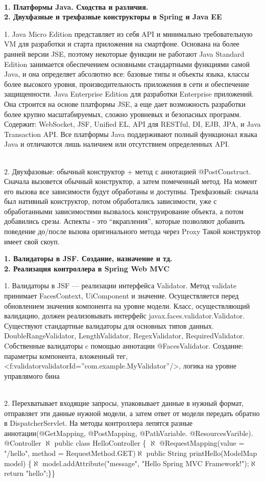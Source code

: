 \documentclass{article}
\newcommand{\bil}[4]{%
    \begin{minipage}{.3\textwidth}
        \textbf{1. #1} \\
        \textbf{2. #2}

        1. #3
        \\
        2. #4
    \end{minipage}
}
\begin{document}
\\
\bil{Платформы Java. Сходства и различия.}{Двухфазные и трехфазные конструкторы в Spring и Java EE}{
    Java Micro Edition представляет из себя API и минимально требовательную VM для разработки и старта приложения на смартфоне. Основана на более ранней версии JSE, поэтому некоторые функции не работают
    Java Standard Edition занимается обеспечением основными стандартными функциями самой Java, и она определяет абсолютно все: базовые типы и объекты языка, классы более высокого уровня, производительность приложения в сети и обеспечение защищенности.
    Java Enterprise Edition для разработки Enterprise приложений. Она строится на основе платформы JSE, а еще дает возможность разработки более крупно масштабируемых, сложно уровневых и безопасных программ. Содержит: WebSocket, JSF, Unified EL, API для RESTful, DI, EJB, JPA, и Java Transaction API.
    Все платформы Java поддерживают полный функционал языка Java и отличаются лишь наличием или отсутствием определенных API.
}{
    Двухфазовые: обычный конструктор + метод с аннотацией @PostConstruct. 
    Сначала вызовется обычный конструктор, а затем помеченный метод. 
    На момент его вызова все зависимости будут обработаны и доступны.
    Трехфазовый: сначала был нативный конструктор, потом обработались зависимости, уже с обработанными зависимостями вызвалось конструирование объекта, а потом добавились срезы. 
    Аспекты - это “вкрапления”, которые позволяют добавить поведение до/после вызова оригинального метода через Proxy
    Такой конструктор имеет свой скоуп.
}
\hfill
\bil{Валидаторы в JSF. Создание, назначение и тд.}{Реализация контроллера в Spring Web MVC}{
    Валидаторы в JSF — реализации интерфейса Validator. Метод validate принимает FacesContext, UiComponent и значение.
    Осуществляется перед обновлением значения компонента на уровне модели. Класс, осуществляющий валидацию, должен реализовывать 
    интерфейс javax.faces.validator.Validator. Существуют стандартные валидаторы для основных типов данных.  
    DoubleRangeValidator, LengthValidator, RegexValidator, RequiredValidator. Cобственные валидаторы c помощью аннотации @FacesValidator.
    Создание: параметры компонента, вложенный тег, <f:validatorvalidatorId=”com.example.MyValidator”/>, логика на уровне управлямого бина
}{
    Перехватывает входящие запросы, упаковывает данные в нужный формат, отправляет эти данные нужной модели, а затем ответ от модели передать обратно в DispatcherServlet. 
    На методы контроллера лепятся разные аннотации(@GetMapping, @PostMapping, @PathVariable. @ResourcesVarible).
    @Controller $\aleph$ public class HelloController \{ $\aleph$ @RequestMapping(value = "/hello", method = RequestMethod.GET)$\aleph$ 
    public String printHello(ModelMap  model) \{$\aleph$ 
    model.addAttribute("message", "Hello Spring MVC Framework!");$\aleph$
    return "hello";\}\}
}
\end{document}
